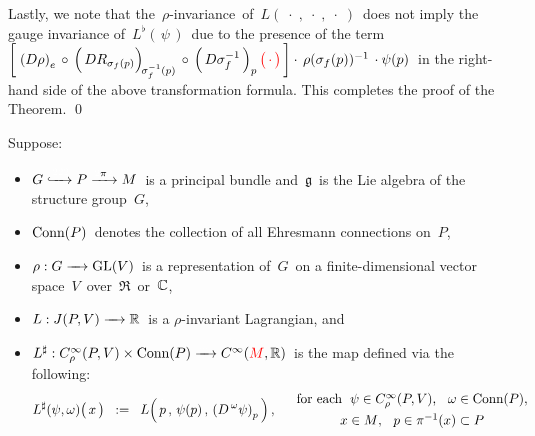 Lastly, we note that the \,$\rho$-invariance\, of \,$L(\;\cdot\;,\;\cdot\;,\;\cdot\;)$\,
does not imply the gauge invariance of \,$L^{\flat}(\,\psi\,)$\, due to the presence
of the term
\,$
\left[\;
    \left(D\rho\right)_{e}
    \,\circ\,
    \left(\,\overset{{\color{white}.}}{DR_{\sigma_{f}(p)}}\right)_{\!\sigma_{f}^{-1}(p)}
    \,\circ\,
    \left(\,D\sigma_{f}^{-1}\,\right)_{p}
    {\color{red}\left(\,\overset{{\color{white}.}}{\cdot}\,\right)}
    \,\right]
\cdot\,
{\color{black}\rho(\sigma_{f}(p))^{-1}}
\,\cdot
\psi(p)
$\,
in the right-hand side of the above transformation formula.
This completes the proof of the Theorem.
\qed


\vskip 0.5cm
\begin{theorem}
\mbox{}
\vskip 0.1cm
\noindent
Suppose:
\begin{itemize}
\item
    \vskip -0.2cm
    $G \xhookrightarrow{{\color{white}222}} P \xrightarrow{{\color{white}2}\pi{\color{white}2}} M$\,
    is a principal bundle and \,$\mathfrak{g}$\, is the Lie algebra of the structure group \,$G$,
\item
    $\textnormal{Conn}(P)$\, denotes the collection of all Ehresmann connections on \,$P$,
\item
    $\rho : G \xrightarrow{{\color{white}....}}\GL(V)$\,
    is a representation of \,$G$\,
    on a finite-dimensional vector space \,$V$\, over \,$\Re$\, or \,$\mathbb{C}$,\,
\item
    $L : J(P,V) \xrightarrow{{\color{white}....}} \Re$\,
    is a {\color{red}$\rho$-invariant Lagrangian}, and
\item
    $
    L^{\sharp} :
    C^{\infty}_{\rho}(P,V) \times \Conn(P)
    \xrightarrow{{\color{white}....}}
    C^{\infty}({\color{red}M},\Re)
    $\,
    is the map defined via the following:
    \begin{equation*}
    L^{\sharp}(\psi,\omega)\!\left(\,\overset{{\color{white}.}}{x}\,\right)
    \;\; := \;\;
        L\!\left(\,
            \overset{{\color{white}1}}{p}
            \,,\,
            \psi(p)
            \,,\,
            \left(D^{\,\omega}\psi\right)_{p}
            \,\right),
    \quad
    \begin{array}{c}
        \textnormal{for each \;$\psi \in C^{\infty}_{\rho}(P,V)$,\;\; $\omega \in \Conn(P)$},
        \\
        \overset{{\color{white}.}}{\textnormal{$x \in M$,\;\; $p \in \pi^{-1}(x) \subset P$}}

\end{array}
\end{equation*}
\end{itemize}
\end{theorem}
